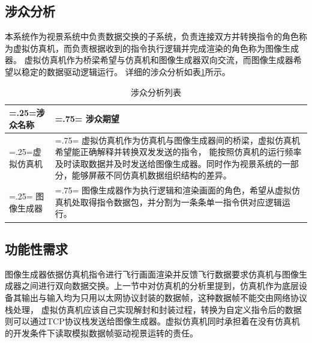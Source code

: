 \subsection{涉众分析}
本系统作为视景系统中负责数据交换的子系统，负责连接双方并转换指令的角色称为虚拟仿真机，而负责根据收到的指令执行逻辑并完成渲染的角色称为图像生成器。
虚拟仿真机作为桥梁希望与仿真机和图像生成器双向交流，而图像生成器希望以稳定的数据驱动逻辑运行。
详细的涉众分析如表\ref{stakeholder}所示。
\begin{table}[h!]
    \begin{center}
        \caption{涉众分析列表}
        \label{stakeholder}
        \renewcommand\arraystretch{1.5}
        \begin{tabularx}{\textwidth}{ 
            | >{\centering\arraybackslash\hsize=.25\hsize\linewidth=\hsize}X 
            | >{\raggedright\arraybackslash\hsize=.75\hsize\linewidth=\hsize}X 
            | }
            \hline
            \textbf{涉众名称} & \textbf{涉众期望}\\
            \hline
            虚拟仿真机 &  虚拟仿真机作为仿真机与图像生成器间的桥梁，虚拟仿真机希望能正确解释并转换双发发送的指令，
                         能按照仿真机的运行频率及时读取数据并及时发送给图像生成器。同时作为视景系统的一部分，能够屏蔽不同仿真机数据组织结构的差异。\\
            \hline
            图像生成器 &  图像生成器作为执行逻辑和渲染画面的角色，希望从虚拟仿真机处取得指令数据包，并分割为一条条单一指令供对应逻辑运行。\\
            \hline
        \end{tabularx}
    \end{center}
\end{table}
\subsection{功能性需求}
图像生成器依据仿真机指令进行飞行画面渲染并反馈飞行数据要求仿真机与图像生成器之间进行双向数据交换。上一节中对仿真机的分析里提到，仿真机作为底层设备其输出与输入均为只用以太网协议封装的数据帧，这种数据帧不能交由网络协议栈处理，
虚拟仿真机应该自己实现解封和封装过程，转换为自定义指令后的数据则可以通过TCP协议栈发送给图像生成器。虚拟仿真机同时承担着在没有仿真机的开发条件下读取模拟数据帧驱动视景运转的责任。

